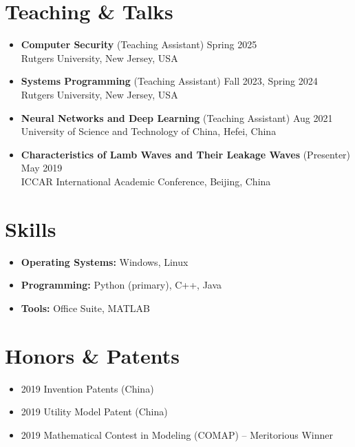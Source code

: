 \documentclass[a4paper,10pt]{article}
\begin{document}
\section{Teaching \& Talks}
\begin{itemize}[leftmargin=*, label={}]
    \item \textbf{Computer Security} (Teaching Assistant) \hfill Spring 2025 \\
    Rutgers University, New Jersey, USA

    \item \textbf{Systems Programming} (Teaching Assistant) \hfill Fall 2023, Spring 2024 \\
    Rutgers University, New Jersey, USA

    \item \textbf{Neural Networks and Deep Learning} (Teaching Assistant) \hfill Aug 2021 \\
    University of Science and Technology of China, Hefei, China

    \item \textbf{Characteristics of Lamb Waves and Their Leakage Waves} (Presenter) \hfill May 2019 \\
    ICCAR International Academic Conference, Beijing, China
\end{itemize}

\section{Skills}
\begin{itemize}[leftmargin=*, label={\textbullet}]
    \item \textbf{Operating Systems:} Windows, Linux
    \item \textbf{Programming:} Python (primary), C++, Java
    \item \textbf{Tools:} Office Suite, MATLAB
\end{itemize}

\section{Honors \& Patents}
\begin{itemize}[leftmargin=*, label={\textbullet}]
    \item 2019 Invention Patents (China)
    \item 2019 Utility Model Patent (China)
    \item 2019 Mathematical Contest in Modeling (COMAP) -- Meritorious Winner
\end{itemize}
\end{document}
